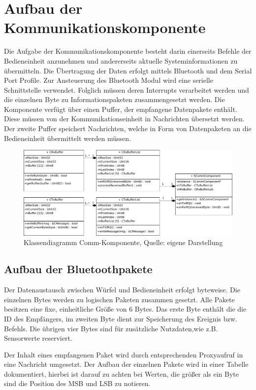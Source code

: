 \documentclass{article}
\begin{document}
\newpage
\section{Aufbau der Kommunikationskomponente}
Die Aufgabe der Kommunikationskomponente besteht darin einerseits Befehle der Bedieneinheit anzunehmen und andererseits aktuelle Systeminformationen zu übermitteln. Die Übertragung der Daten erfolgt mittels Bluetooth und dem Serial Port Profile. Zur Ansteuerung des Bluetooth Modul wird eine serielle Schnittstelle verwendet. Folglich müssen deren Interrupts verarbeitet werden und die einzelnen Byte zu Informationspaketen zusammengesetzt werden. 
Die Komponente verfügt über einen Puffer, der empfangene Datenpakete enthält. Diese müssen von der Kommunikationseinheit in Nachrichten übersetzt werden. Der zweite Puffer speichert Nachrichten, welche in Form von Datenpaketen an die Bedieneinheit übermittelt werden müssen.

\begin{figure}[h]
	\includegraphics[width=\linewidth]{CommBuffer}
	\caption{Klassendiagramm Comm-Komponente, Quelle: eigene Darstellung}
\end{figure}

\subsection*{Aufbau der Bluetoothpakete}
Der Datenaustausch zwischen Würfel und Bedieneinheit erfolgt byteweise. Die einzelnen Bytes werden zu logischen Paketen zusammen gesetzt. Alle Pakete besitzen eine fixe, einheitliche Größe von 6 Bytes. Das erste Byte enthält die die ID des Empfängers, im zweiten Byte dient zur Speicherung des Ereignis bzw. Befehls. Die übrigen vier Bytes sind für zusätzliche Nutzdaten,wie z.B. Sensorwerte reserviert.

Der Inhalt eines empfangenen Paket wird durch entsprechenden Proxyaufruf in eine Nachricht umgesetzt. Der Aufbau der einzelnen Pakete wird in einer Tabelle dokumentiert, hierbei ist darauf zu achten bei Werten, die größer als ein Byte sind die Position des MSB und LSB zu notieren.
\end{document}
